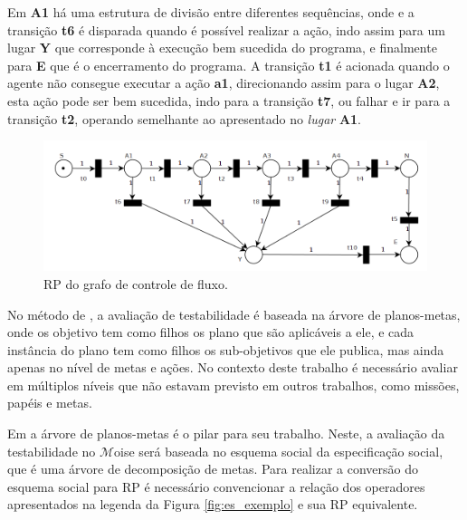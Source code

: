 Em \textbf{A1} há uma estrutura de divisão entre diferentes sequências, onde e a transição \textbf{t6} é disparada quando é possível realizar a ação, indo assim para um lugar \textbf{Y} que corresponde à execução bem sucedida do programa, e finalmente para \textbf{E} que é o encerramento do programa. A transição \textbf{t1} é acionada quando o agente não consegue executar a ação \textbf{a1}, direcionando assim para o lugar \textbf{A2}, esta ação pode ser bem sucedida, indo para a transição \textbf{t7}, ou falhar e ir para a transição \textbf{t2}, operando semelhante ao apresentado no \textit{lugar} \textbf{A1}.

\begin{figure}[ht]
    \centering
    \includegraphics[scale=0.4]{imagens/4-fluxo-rp2.png}
    \caption{RP do grafo de controle de fluxo.}
    \label{fig:cf_rp}
\end{figure}

No método de \cite{winikoff2014testability,winikoff2017bdi}, a avaliação de testabilidade é baseada na árvore de planos-metas, onde os objetivo tem como filhos os plano que são aplicáveis a ele, e cada instância do plano tem como filhos os sub-objetivos que ele publica, mas ainda apenas no nível de metas e ações. No contexto deste trabalho é necessário avaliar em múltiplos níveis que não estavam previsto em outros trabalhos, como missões, papéis e metas.



Em \cite{winikoff2014testability} a árvore de planos-metas é o pilar para seu trabalho. Neste, a avaliação da testabilidade no $\mathcal{M}$oise será baseada no esquema social da especificação social, que é uma árvore de decomposição de metas. Para realizar a conversão do esquema social para RP é necessário convencionar a relação dos operadores apresentados na legenda da Figura \ref{fig:es_exemplo} e sua RP equivalente.

